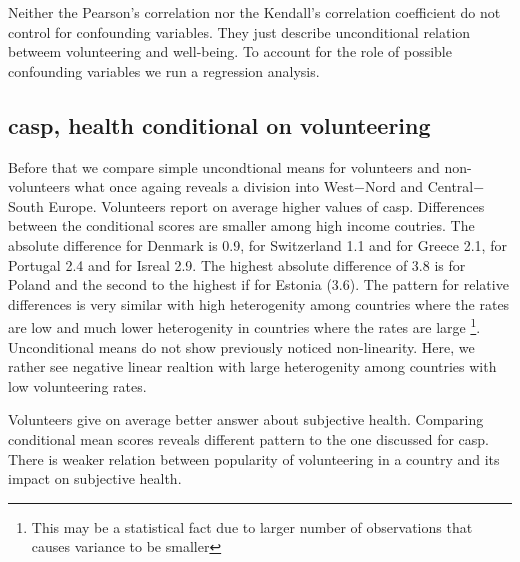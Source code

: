 \documentclass[10pt, letterpaper]{article}
\begin{document}
\begin{spacing}{1.4}
Neither the Pearson's correlation nor the Kendall's correlation coefficient  do not control for confounding variables. They just describe unconditional relation betweem volunteering and well-being. To account for the role of possible confounding variables we run a regression analysis.   

\subsection{casp, health conditional on volunteering }

Before that we compare simple uncondtional means for volunteers and non-volunteers what once againg reveals a division into West$-$Nord and Central$-$South Europe. Volunteers report on average higher values of casp. Differences between the conditional scores are smaller among  high income coutries. The absolute difference for Denmark  is 0.9, for Switzerland 1.1 and for Greece 2.1, for Portugal 2.4 and for Isreal 2.9. The highest absolute difference of 3.8 is for Poland and the second to the highest if for Estonia (3.6). The pattern for relative differences is very similar with high heterogenity among countries where the rates are low and much lower heterogenity in countries where the rates are large \footnote{This may be a statistical fact due to larger number of observations that causes variance to be smaller}. 
Unconditional means do not show previously noticed non-linearity. Here, we rather see negative linear realtion with large heterogenity among countries with low volunteering rates.

Volunteers give on average better answer about subjective health. Comparing conditional mean scores reveals different pattern to the one discussed for casp. There is weaker relation between popularity of volunteering in a country and its impact on subjective health. 



\end{spacing}
\end{document}
